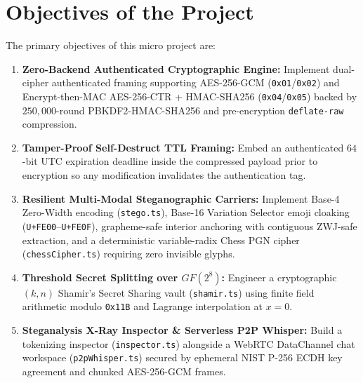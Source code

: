 \documentclass[12pt,a4paper,oneside,openany]{report}
\begin{document}
\section{Objectives of the Project}
The primary objectives of this micro project are:
\begin{enumerate}
    \item \textbf{Zero-Backend Authenticated Cryptographic Engine:} Implement dual-cipher authenticated framing supporting AES-256-GCM (\texttt{0x01}/\texttt{0x02}) and Encrypt-then-MAC AES-256-CTR + HMAC-SHA256 (\texttt{0x04}/\texttt{0x05}) backed by $250{,}000$-round PBKDF2-HMAC-SHA256 and pre-encryption \texttt{deflate-raw} compression.
    \item \textbf{Tamper-Proof Self-Destruct TTL Framing:} Embed an authenticated $64$-bit UTC expiration deadline inside the compressed payload prior to encryption so any modification invalidates the authentication tag.
    \item \textbf{Resilient Multi-Modal Steganographic Carriers:} Implement Base-4 Zero-Width encoding (\texttt{stego.ts}), Base-16 Variation Selector emoji cloaking (\texttt{U+FE00}--\texttt{U+FE0F}), grapheme-safe interior anchoring with contiguous ZWJ-safe extraction, and a deterministic variable-radix Chess PGN cipher (\texttt{chessCipher.ts}) requiring zero invisible glyphs.
    \item \textbf{Threshold Secret Splitting over $GF(2^8)$:} Engineer a cryptographic $(k, n)$ Shamir's Secret Sharing vault (\texttt{shamir.ts}) using finite field arithmetic modulo \texttt{0x11B} and Lagrange interpolation at $x=0$.
    \item \textbf{Steganalysis X-Ray Inspector \& Serverless P2P Whisper:} Build a tokenizing inspector (\texttt{inspector.ts}) alongside a WebRTC DataChannel chat workspace (\texttt{p2pWhisper.ts}) secured by ephemeral NIST P-256 ECDH key agreement and chunked AES-256-GCM frames.
\end{enumerate}
\end{document}
